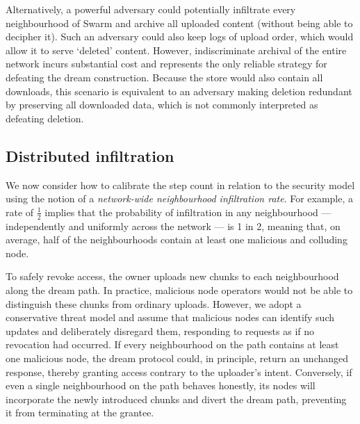 \documentclass[singlecolumn]{acmart}
\begin{document}
Alternatively, a powerful adversary could potentially infiltrate every neighbourhood of Swarm and archive all uploaded content (without being able to decipher it). Such an adversary could also keep logs of upload order, which would allow it to serve `deleted' content. However, indiscriminate archival of the entire network incurs substantial cost and represents the only reliable strategy for defeating the dream construction. Because the store would also contain all downloads, this scenario is equivalent to an adversary making deletion redundant by preserving all downloaded data, which is not commonly interpreted as defeating deletion.


\subsection{Distributed infiltration}

We now consider how to calibrate the step count in relation to the security model using the notion of a \emph{network-wide neighbourhood infiltration rate}. For example, a rate of $\frac{1}{2}$ implies that the probability of infiltration in any neighbourhood — independently and uniformly across the network — is 1 in 2, meaning that, on average, half of the neighbourhoods contain at least one malicious and colluding node. 

To safely revoke access, the owner uploads new chunks to each neighbourhood along the dream path. In practice, malicious node operators would not be able to distinguish these chunks from ordinary uploads. However, we adopt a conservative threat model and assume that malicious nodes can identify such updates and deliberately disregard them, responding to requests as if no revocation had occurred. If every neighbourhood on the path contains at least one malicious node, the dream protocol could, in principle, return an unchanged response, thereby granting access contrary to the uploader's intent. Conversely, if even a single neighbourhood on the path behaves honestly, its nodes will incorporate the newly introduced chunks and divert the dream path, preventing it from terminating at the grantee.
\end{document}
